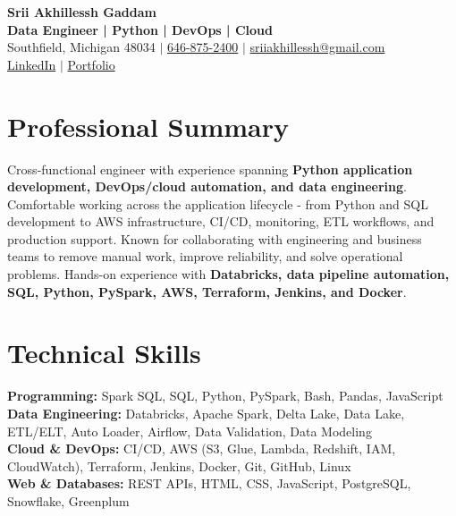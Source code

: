 \documentclass[letterpaper,10pt]{article}
\begin{document}
\fontsize{9.35pt}{10.45pt}\selectfont

\begin{center}
    {\LARGE \textbf{Srii Akhillessh Gaddam}} \\[-1pt]
    \textbf{Data Engineer | Python | DevOps | Cloud} \\[2pt]
    Southfield, Michigan 48034 $|$
    \href{tel:6468752400}{646-875-2400} $|$
    \href{mailto:sriiakhillessh@gmail.com}{sriiakhillessh@gmail.com} \\[1pt]
    \href{https://www.linkedin.com/in/srii-akhiilessh-gaddam-b48668191/}{LinkedIn} $|$
    \href{https://sriiakhillesshg.github.io/portfolio/}{Portfolio}
\end{center}
\vspace{-8pt}

\section{Professional Summary}
\small{Cross-functional engineer with experience spanning \textbf{Python application development, DevOps/cloud automation, and data engineering}. Comfortable working across the application lifecycle - from Python and SQL development to AWS infrastructure, CI/CD, monitoring, ETL workflows, and production support. Known for collaborating with engineering and business teams to remove manual work, improve reliability, and solve operational problems. Hands-on experience with \textbf{Databricks, data pipeline automation, SQL, Python, PySpark, AWS, Terraform, Jenkins, and Docker}.}

\section{Technical Skills}
\small{
\textbf{Programming:} Spark SQL, SQL, Python, PySpark, Bash, Pandas, JavaScript \\
\textbf{Data Engineering:} Databricks, Apache Spark, Delta Lake, Data Lake, ETL/ELT, Auto Loader, Airflow, Data Validation, Data Modeling \\
\textbf{Cloud \& DevOps:} CI/CD, AWS (S3, Glue, Lambda, Redshift, IAM, CloudWatch), Terraform, Jenkins, Docker, Git, GitHub, Linux \\
\textbf{Web \& Databases:} REST APIs, HTML, CSS, JavaScript, PostgreSQL, Snowflake, Greenplum
}
\end{document}
